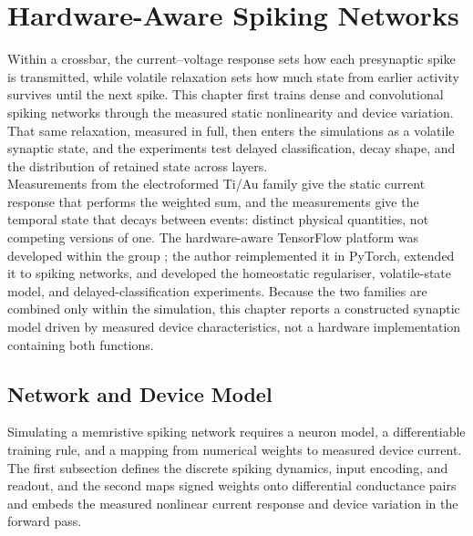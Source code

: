 
\chapter{Hardware-Aware Spiking Networks}\label{ch:bio}

\noindent Within a crossbar, the current--voltage response sets how each presynaptic spike is transmitted, while
volatile relaxation sets how much state from earlier activity survives until the next spike. This chapter first
trains dense and convolutional spiking networks through the measured static nonlinearity and device variation. That
same relaxation, measured in full, then enters the simulations as a volatile synaptic state, and the experiments test
delayed classification, decay shape, and the distribution of retained state across layers.\\

\noindent Measurements from the electroformed Ti/Au family give the static current response that performs the
weighted sum, and the  measurements give the temporal state that decays between events: distinct
physical quantities, not competing versions of one. The hardware-aware TensorFlow platform was developed within the
group \cite{joksas2022nonideality}; the author reimplemented it in PyTorch, extended it to spiking networks, and
developed the homeostatic regulariser, volatile-state model, and delayed-classification experiments. Because the two
families are combined only within the simulation, this chapter reports a constructed synaptic model driven by
measured device characteristics, not a hardware implementation containing both functions.

\section[Network and Device Model]{Network and Device Model}\label{sec:6p1}

\noindent Simulating a memristive spiking network requires a neuron model, a differentiable training rule, and a
mapping from numerical weights to measured device current. The first subsection defines the discrete spiking dynamics,
input encoding, and readout, and the second maps signed weights onto differential conductance pairs and embeds the
measured nonlinear current response and device variation in the forward pass.

